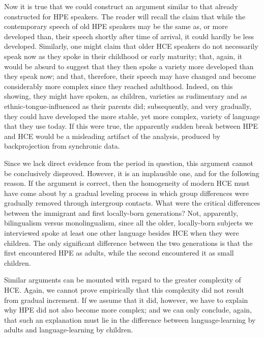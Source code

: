 Now it is true that we could construct an argument similar to that already constructed for HPE speakers. The reader will recall the claim that while the contemporary speech of old HPE speakers may be the same as, or more developed than, their speech shortly after time of
arrival, it could hardly be less developed. Similarly, one might claim that older HCE speakers do not necessarily speak now as they spoke in their childhood or early maturity; that, again, it would be absurd to suggest that they then spoke a variety more developed than they speak now; and that, therefore, their speech may have changed and become considerably more complex since they reached adulthood. Indeed, on this showing, they might have spoken, as children, varieties as rudimentary and as ethnic-tongue-influenced as their parents did; subsequently, and very gradually, they could have developed the more stable, yet more complex, variety of language that they use today. If this were true, the apparently sudden break between HPE and HCE would be a misleading artifact of the analysis, produced by back\-projection from synchronic data.

Since we lack direct evidence from the period in question, this argument cannot be conclusively disproved. However, it is an im\-plausible one, and for the following reason. If the argument is correct, then the homogeneity of modern HCE must have come about by a gradual leveling process in which group differences were gradually removed through intergroup contacts. What were the critical differ\-ences between the immigrant and first locally-born generations? Not, apparently, bilingualism versus monolingualism, since all the older, locally-born subjects we interviewed spoke at least one other language besides HCE when they were children. The only significant difference between the two generations is that the first encountered HPE as adults, while the second encountered it as small children.

Similar arguments can be mounted with regard to the greater complexity of HCE. Again, we cannot prove empirically that this complexity did not result from gradual increment. If we assume that it did, however, we have to explain why HPE did not also become more complex; and we can only conclude, again, that such an explanation must lie in the difference between language-learning by adults and language-learning by children.

